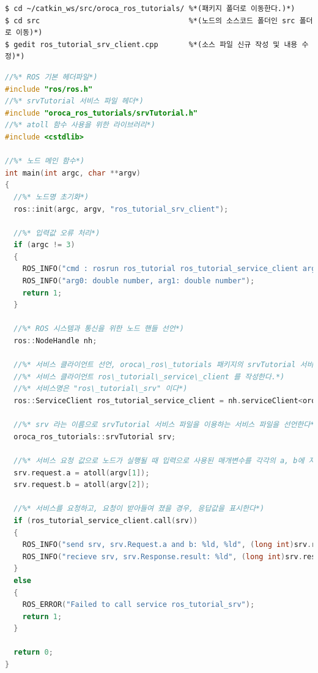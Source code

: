 \begin{lstlisting}[language=ROS]
$ cd ~/catkin_ws/src/oroca_ros_tutorials/ %*(패키지 폴더로 이동한다.)*)
$ cd src                                  %*(노드의 소스코드 폴더인 src 폴더로 이동)*)
$ gedit ros_tutorial_srv_client.cpp       %*(소스 파일 신규 작성 및 내용 수정)*)
\end{lstlisting}

\begin{lstlisting}[language=C++]
//%* ROS 기본 헤더파일*)
#include "ros/ros.h"
//%* srvTutorial 서비스 파일 헤더*)
#include "oroca_ros_tutorials/srvTutorial.h"
//%* atoll 함수 사용을 위한 라이브러리*)
#include <cstdlib>

//%* 노드 메인 함수*)
int main(int argc, char **argv)
{
  //%* 노드명 초기화*)
  ros::init(argc, argv, "ros_tutorial_srv_client");

  //%* 입력값 오류 처리*)
  if (argc != 3)                                    
  {
    ROS_INFO("cmd : rosrun ros_tutorial ros_tutorial_service_client arg0 arg1");
    ROS_INFO("arg0: double number, arg1: double number");
    return 1;
  }

  //%* ROS 시스템과 통신을 위한 노드 핸들 선언*)
  ros::NodeHandle nh;

  //%* 서비스 클라이언트 선언, oroca\_ros\_tutorials 패키지의 srvTutorial 서비스 파일을 이용한*)
  //%* 서비스 클라이언트 ros\_tutorial\_service\_client 를 작성한다.*)
  //%* 서비스명은 "ros\_tutorial\_srv" 이다*)
  ros::ServiceClient ros_tutorial_service_client = nh.serviceClient<oroca_ros_tutorials::srvTutorial>("ros_tutorial_srv");

  //%* srv 라는 이름으로 srvTutorial 서비스 파일을 이용하는 서비스 파일을 선언한다*)
  oroca_ros_tutorials::srvTutorial srv;

  //%* 서비스 요청 값으로 노드가 실행될 때 입력으로 사용된 매개변수를 각각의 a, b에 저장한다*)
  srv.request.a = atoll(argv[1]);
  srv.request.b = atoll(argv[2]);

  //%* 서비스를 요청하고, 요청이 받아들여 졌을 경우, 응답값을 표시한다*)
  if (ros_tutorial_service_client.call(srv))
  {
    ROS_INFO("send srv, srv.Request.a and b: %ld, %ld", (long int)srv.request.a, (long int)srv.request.b);
    ROS_INFO("recieve srv, srv.Response.result: %ld", (long int)srv.response.result);
  }
  else
  {
    ROS_ERROR("Failed to call service ros_tutorial_srv");
    return 1;
  }

  return 0;
}
\end{lstlisting}

